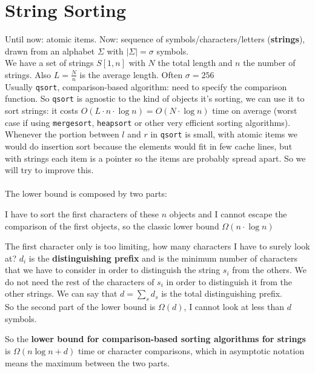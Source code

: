 \documentclass[10pt]{report}
\begin{document}
\section{String Sorting} Until now: atomic items. Now: sequence of symbols/characters/letters (\textbf{strings}), drawn from an alphabet $\Sigma$ with $|\Sigma| = \sigma$ symbols.\\
We have a set of strings $S[1,n]$ with $N$ the total length and $n$ the number of strings. Also $L=\frac{N}{n}$ is the average length. Often $\sigma = 256$\\
Usually \texttt{qsort}, comparison-based algorithm: need to specify the comparison function. So \texttt{qsort} is agnostic to the kind of objects it's sorting, we can use it to sort strings: it costs $O(L\cdot n\cdot\log n) = O(N\cdot\log n)$ time on average (worst case if using \texttt{mergesort}, \texttt{heapsort} or other very efficient sorting algorithms). Whenever the portion between $l$ and $r$ in \texttt{qsort} is small, with atomic items we would do insertion sort because the elements would fit in few cache lines, but with strings each item is a pointer so the items are probably spread apart. So we will try to improve this.\\\\
The lower bound is composed by two parts: \begin{list}{}{}
	\item I have to sort the first characters of these $n$ objects and I cannot escape the comparison of the first objects, so the classic lower bound $\Omega(n\cdot\log n)$
	\item The first character only is too limiting, how many characters I have to surely look at? $d_i$ is the \textbf{distinguishing prefix} and is the minimum number of characters that we have to consider in order to distinguish the string $s_i$ from the others. We do not need the rest of the characters of $s_i$ in order to distinguish it from the other strings. We can say that $d = \sum_s d_s$ is the total distinguishing prefix.\\
	So the second part of the lower bound is $\Omega(d)$, I cannot look at less than $d$ symbols.
\end{list}
So the \textbf{lower bound for comparison-based sorting algorithms for strings} is $\Omega(n\log n + d)$ time or character comparisons, which in asymptotic notation means the maximum between the two parts.
\end{document}
